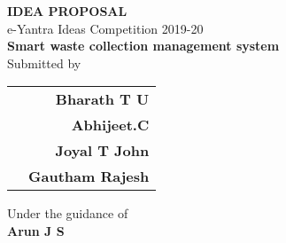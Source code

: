 \begin{titlepage}

\begin{center}

\textup{\huge {\bf IDEA PROPOSAL } \\[0.10in] e-Yantra Ideas Competition 2019-20}\\[0.50in]


     \huge{\bf Smart waste collection management system} \\[0.80in]
       

\normalsize Submitted by \\
\begin{table}[h]
\centering
\begin{tabular}{lr}  

  &{\textbf{\normalsize Bharath T U}}\\
    &{\textbf{\normalsize Abhijeet.C}}\\
    &{\textbf{\normalsize Joyal T John}}\\
    &{\textbf{\normalsize Gautham Rajesh}}\\

\end{tabular}
\end{table}

\vspace{.01in}
Under the guidance of\\
{\textbf{\large Arun J S}}\\[0.2in]

\vfill



\end{center}

\end{titlepage}
